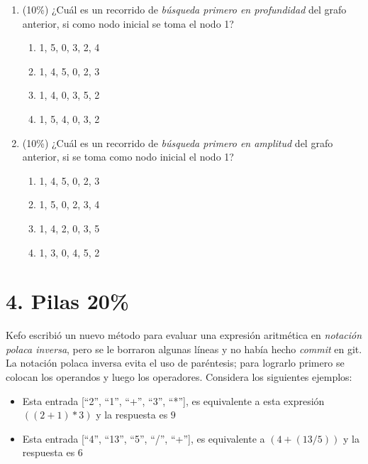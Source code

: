 \documentclass[10 pt]{article}
\begin{document}
\begin{multicols}{2}
\begin{center}
	\end{center}
	\begin{enumerate}[label=\alph*)]
		\item (10\%) ¿Cuál es un recorrido de \emph{búsqueda primero en profundidad} del grafo anterior, si como nodo inicial se toma el nodo 1?
		\begin{enumerate}[label=\roman*)]
			\item 1, 5, 0, 3, 2, 4
			\item 1, 4, 5, 0, 2, 3
			\item 1, 4, 0, 3, 5, 2
			\item 1, 5, 4, 0, 3, 2
		\end{enumerate}
	    \item (10\%) ¿Cuál es un recorrido de \emph{búsqueda primero en amplitud} del grafo anterior, si se toma como nodo inicial el nodo 1?
	    \begin{enumerate}[label=\roman*)]
	    	\item 1, 4, 5, 0, 2, 3
	    	\item 1, 5, 0, 2, 3, 4
	    	\item 1, 4, 2, 0, 3, 5
	    	\item 1, 3, 0, 4, 5, 2
	    \end{enumerate}
	\end{enumerate}

\section{4. Pilas 20\%}
Kefo escribió un nuevo método para evaluar una expresión aritmética en 
\emph{notación polaca inversa}, pero se le borraron algunas líneas y no había hecho \emph{commit} en git. La notación polaca inversa evita el uso de
paréntesis; para lograrlo primero se colocan los operandos y luego 
los operadores. Considera los siguientes ejemplos:
\begin{itemize}
  \item Esta entrada [``2'', ``1'', ``+'', ``3'', ``*''], es equivalente a esta expresión $((2 + 1) * 3)$  y la respuesta es $9$
  \item Esta entrada [``4'', ``13'', ``5'', ``/'', ``+''], es equivalente a  $(4 + (13 / 5))$ y la respuesta es $6$
\end{itemize}


\end{multicols}
\end{document}
